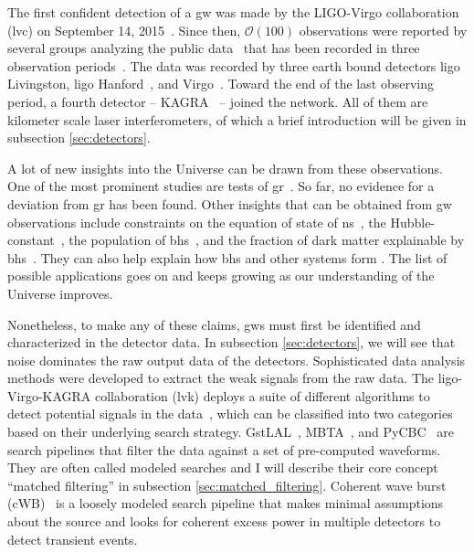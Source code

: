 The first confident detection of a \acrshort{gw} was made by the LIGO-Virgo collaboration (\acrshort{lvc}) on September 14, 2015~\cite{LIGOScientific:2016aoc}. Since then, $\mathcal{O}(100)$ observations were reported by several groups analyzing the public data~\cite{LIGOScientific:2019lzm} that has been recorded in three observation periods~\cite{LIGOScientific:2021djp, Nitz:2021zwj, Venumadhav:2019tad, Venumadhav:2019lyq, Olsen:2022pin}. The data was recorded by three earth bound detectors \acrshort{ligo} Livingston, \acrshort{ligo} Hanford~\cite{LIGOScientific:2014pky}, and Virgo~\cite{VIRGO:2014yos}. Toward the end of the last observing period, a fourth detector -- KAGRA~\cite{KAGRA:2018plz} -- joined the network. All of them are kilometer scale laser interferometers, of which a brief introduction will be given in subsection \ref{sec:detectors}.

A lot of new insights into the Universe can be drawn from these observations. One of the most prominent studies are tests of \acrshort{gr}~\cite{LIGOScientific:2016lio, LIGOScientific:2021sio, Shoom:2021mdj, Krishnendu:2021fga}. So far, no evidence for a deviation from \acrshort{gr} has been found. Other insights that can be obtained from \acrshort{gw} observations include constraints on the equation of state of \acrshort{ns}~\cite{LIGOScientific:2018cki, Capano:2019eae}, the Hubble-constant~\cite{LIGOScientific:2018gmd, DES:2019ccw}, the population of \acrshort{bh}s~\cite{LIGOScientific:2021psn}, and the fraction of dark matter explainable by \acrshort{bh}s~\cite{Sasaki:2018dmp, LIGOScientific:2021job, Basak:2021ten}. They can also help explain how \acrshort{bh}s and other systems form \cite{Broekgaarden:2021hlu}. The list of possible applications goes on and keeps growing as our understanding of the Universe improves.

Nonetheless, to make any of these claims, \acrshort{gw}s must first be identified and characterized in the detector data. In subsection \ref{sec:detectors}, we will see that noise dominates the raw output data of the detectors. Sophisticated data analysis methods were developed to extract the weak signals from the raw data. The \acrshort{ligo}-Virgo-KAGRA collaboration (\acrshort{lvk}) deploys a suite of different algorithms to detect potential signals in the data~\cite{LIGOScientific:2021djp}, which can be classified into two categories based on their underlying search strategy. GstLAL~\cite{Messick:2016aqy, Sachdev:2019vvd, Hanna:2019ezx, Cannon:2020qnf}, MBTA~\cite{Adams:2015ulm, Aubin:2020goo}, and PyCBC~\cite{Allen:2005fk, Usman:2015kfa, Nitz:2017svb, Nitz:2018rgo, Davies:2020tsx} are search pipelines that filter the data against a set of pre-computed waveforms. They are often called modeled searches and I will describe their core concept ``matched filtering'' in subsection \ref{sec:matched_filtering}. Coherent wave burst (cWB)~\cite{Klimenko:2004qh, Klimenko:2011hz, Klimenko:2015ypf, Mishra:2022ott} is a loosely modeled search pipeline that makes minimal assumptions about the source and looks for coherent excess power in multiple detectors to detect transient events.

